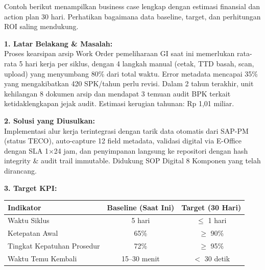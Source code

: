 \documentclass[12pt,a4paper]{report}
\begin{document}
\vspace{0.3cm}

\begin{contohbox}
Contoh berikut menampilkan business case lengkap dengan estimasi finansial dan action plan 30 hari. Perhatikan bagaimana data baseline, target, dan perhitungan ROI saling mendukung.
\end{contohbox}

\vspace{0.3cm}

\begin{tcolorbox}[colback=fillgreen, colframe=plnblue, sharp corners, title={\bfseries Business Case 1 Halaman}]
\small

\noindent\textbf{1. Latar Belakang \& Masalah:}\\
Proses kearsipan arsip Work Order pemeliharaan GI saat ini memerlukan rata-rata 5 hari kerja per siklus, dengan 4 langkah manual (cetak, TTD basah, scan, upload) yang menyumbang 80\% dari total waktu. Error metadata mencapai 35\% yang mengakibatkan 420 SPK/tahun perlu revisi. Dalam 2 tahun terakhir, unit kehilangan 8 dokumen arsip dan mendapat 3 temuan audit BPK terkait ketidaklengkapan jejak audit. Estimasi kerugian tahunan: Rp 1,01 miliar.

\vspace{0.2cm}
\noindent\textbf{2. Solusi yang Diusulkan:}\\
Implementasi alur kerja terintegrasi dengan tarik data otomatis dari SAP-PM (status TECO), auto-capture 12 field metadata, validasi digital via E-Office dengan SLA 1$\times$24 jam, dan penyimpanan langsung ke repositori dengan hash integrity \& audit trail immutable. Didukung SOP Digital 8 Komponen yang telah dirancang.

\vspace{0.2cm}
\noindent\textbf{3. Target KPI:}

\vspace{0.2cm}
{
\renewcommand{\arraystretch}{1.5}
\begin{tabularx}{\textwidth}{@{} >{\raggedright\arraybackslash}X c c @{}}
\toprule
\textbf{Indikator} & \textbf{Baseline (Saat Ini)} & \textbf{Target (30 Hari)} \\
\midrule
Waktu Siklus & 5 hari & $\leq$ 1 hari \\
\hline
Ketepatan Awal & 65\% & $\geq$ 90\% \\
\hline
Tingkat Kepatuhan Prosedur & 72\% & $\geq$ 95\% \\
\hline
Waktu Temu Kembali & 15--30 menit & $<$ 30 detik \\
\bottomrule
\end{tabularx}
\renewcommand{\arraystretch}{1.0}
}


\end{tcolorbox}
\end{document}
